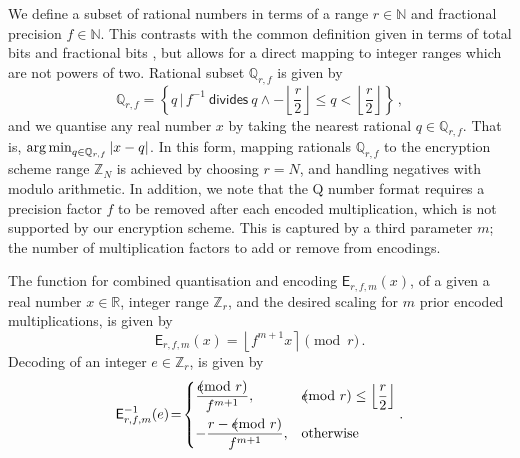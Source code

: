 \documentclass[10pt,journal,compsoc]{IEEEtran}
\theoremstyle{definition}
\theoremstyle{definition}
\theoremstyle{remark}
\begin{document}
We define a subset of rational numbers in terms of a range $r \in \mathbb{N}$ and fractional precision $f \in \mathbb{N}$. This contrasts with the common definition given in terms of total bits and fractional bits \cite{oberstarFixedPointRepresentationFractional2007,schulzedarupEncryptedCooperativeControl2019,farokhiSecurePrivateControl2017}, but allows for a direct mapping to integer ranges which are not powers of two. Rational subset $\mathbb{Q}_{r,f}$ is given by
\begin{equation}
    \mathbb{Q}_{r,f} = \left\{q \,|\, f^{-1}\ \textsf{divides}\ q \wedge -\left\lfloor\frac{r}{2}\right\rfloor \leq q < \left\lfloor\frac{r}{2}\right\rfloor \right\}\,,
\end{equation}
and we quantise any real number $x$ by taking the nearest rational $q \in \mathbb{Q}_{r,f}$. That is, $\operatorname*{arg\,min}_{q\in\mathbb{Q}_{r,f}} |x-q|$. In this form, mapping rationals $\mathbb{Q}_{r,f}$ to the encryption scheme range $\mathbb{Z}_N$ is achieved by choosing $r=N$, and handling negatives with modulo arithmetic. In addition, we note that the Q number format requires a precision factor $f$ to be removed after each encoded multiplication, which is not supported by our encryption scheme. This is captured by a third parameter $m$; the number of multiplication factors to add or remove from encodings.

The function for combined quantisation and encoding $\mathsf{E}_{r,f,m}(x)$, of a given a real number $x \in \mathbb{R}$, integer range $\mathbb{Z}_r$, and the desired scaling for $m$ prior encoded multiplications, is given by
\begin{equation}
    \mathsf{E}_{r,f,m}(x) = \left\lfloor f^{m+1} x \right\rceil \pmod{r}\,. \label{eqn:encode}
\end{equation}
Decoding of an integer $e \in \mathbb{Z}_r$, is given by
\begin{equation}
    \mathsf{E}^{-1}_{r,f,m}(e) \!=\! 
    \begin{dcases}
        \frac{e\hspace{-8pt}\pmod{r}}{f^{m+1}}, &e\hspace{-8pt}\pmod{r} \leq \left\lfloor\frac{r}{2}\right\rfloor \\
        -\frac{r - e\hspace{-8pt}\pmod{r}}{f^{m+1}}, &\text{otherwise} \\
    \end{dcases}.\label{eqn:decode}
\end{equation}
\end{document}
